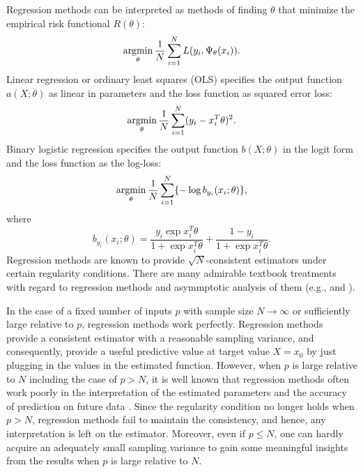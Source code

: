 \documentclass[12pt]{article}
\newcommand{\argmin}{\mathop{\rm argmin}\limits}
\begin{document}
Regression methods can be interpreted as methods of finding $\theta$ that minimize the empirical risk functional $R(\theta)$:
\begin{equation*}
\argmin_{\theta} \frac{1}{N} \sum_{i=1}^{N} L(y_i, \Psi_{\theta}(x_i)).
\end{equation*}
Linear regression or ordinary least squares (OLS) specifies the output function $a(X;\theta)$ as linear in parameters and the loss function as squared error loss:
\begin{equation*}
\argmin_{\theta} \frac{1}{N} \sum_{i=1}^{N} (y_i - x_i^T \theta)^2.
\end{equation*}
Binary logistic regression specifies the output function $b(X;\theta)$ in the logit form and the loss function as the log-loss:
\begin{equation*}
\argmin_{\theta} \frac{1}{N} \sum_{i=1}^{N} \{- \log b_{y_i}(x_i;\theta)\},
\end{equation*}
where
\begin{equation*}
b_{y_i}(x_i;\theta) = \frac{y_i \exp{x_i^T \theta}}{1 + \exp{x_i^T \theta}} + \frac{1-y_i}{1 + \exp{x_i^T \theta}}.
\end{equation*}
Regression methods are known to provide $\sqrt{N}$-consistent estimators under certain regularity conditions. There are many admirable textbook treatments with regard to regression methods and asymmptotic analysis of them (e.g., \textcite{Wooldridge2010} and \textcite{Greene2012}).

In the case of a fixed number of inputs $p$ with sample size $N \to \infty$ or sufficiently large relative to $p$, regression methods work perfectly. Regression methods provide a consistent estimator with a reasonable sampling variance, and consequently, provide a useful predictive value at target value $X = x_0$ by just plugging in the values in the estimated function. However, when $p$ is large relative to $N$ including the case of $p > N$, it is well known that regression methods often work poorly in the interpretation of the estimated parameters and the accuracy of prediction on future data \parencite{Zou2005}. Since the regularity condition no longer holds when $p > N$, regression methods fail to maintain the consistency, and hence, any interpretation is left on the estimator. Moreover, even if $p \leq N$, one can hardly acquire an adequately small sampling variance to gain some meaningful insights from the results when $p$ is large relative to $N$.
\end{document}
